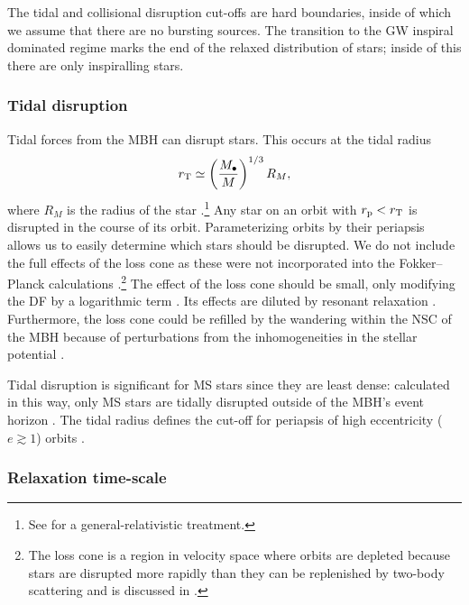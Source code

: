 The tidal and collisional disruption cut-offs are hard boundaries, inside of which we assume that there are no bursting sources. The transition to the GW inspiral dominated regime marks the end of the relaxed distribution of stars; inside of this there are only inspiralling stars.

\subsubsection{Tidal disruption}\label{sec:Tidal}

Tidal forces from the MBH can disrupt stars. This occurs at the tidal radius
\begin{equation}
r_\mathrm{T} \simeq \left(\dfrac{M_\bullet}{M}\right)^{1/3}R_M,
\label{eq:Tidal}
\end{equation}
where $R_M$ is the radius of the star \citep{Hills1975, Rees1988, Kobayashi2004}.\footnote{See \citet{Kesden2012} for a general-relativistic treatment.} Any star on an orbit with $r_\mathrm{p} < r_\mathrm{T}$ is disrupted in the course of its orbit. Parameterizing orbits by their periapsis allows us to easily determine which stars should be disrupted. We do not include the full effects of the loss cone \citep{Frank1976, Lightman1977, Cohn1978} as these were not incorporated into the Fokker--Planck calculations \citep{Hopman2009}.\footnote{The loss cone is a region in velocity space where orbits are depleted because stars are disrupted more rapidly than they can be replenished by two-body scattering and is discussed in .} The effect of the loss cone should be small, only modifying the DF by a logarithmic term \citep{Lightman1977, Bahcall1977, Cohn1978}. Its effects are diluted by resonant relaxation \citep{Hopman2007,Toonen2009,Merritt2011}. Furthermore, the loss cone could be refilled by the wandering within the NSC of the MBH because of perturbations from the inhomogeneities in the stellar potential \citep{Sigurdsson1997,Chatterjee2002,Merritt2007}.

Tidal disruption is significant for MS stars since they are least dense: calculated in this way, only MS stars are tidally disrupted outside of the MBH's event horizon \citep{Sigurdsson1997}. The tidal radius defines the cut-off for periapsis of high eccentricity ($e \gtrsim 1$) orbits \citep{Lightman1977}.

\subsubsection{Relaxation time-scale}\label{sec:Relax}

